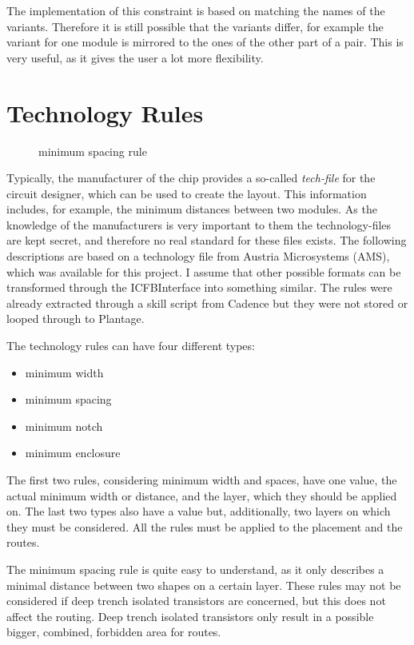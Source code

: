 The implementation of this constraint is based on matching the names of the variants. Therefore it is still possible that the variants differ, for example the variant for one module is mirrored to the ones of the other part of a pair. This is very useful, as it gives the user a lot more flexibility.

\section{Technology Rules}

\begin{figure}
	\centering
	
	\caption{minimum spacing rule}
	\label{fig:technology_rule_spacing}
\end{figure}

Typically, the manufacturer of the chip provides a so-called \textit{tech-file} for the circuit designer, which can be used to create the layout. This information includes, for example, the minimum distances between two modules. As the knowledge of the manufacturers is very important to them the technology-files are kept secret, and therefore no real standard for these files exists. The following descriptions are based on a technology file from Austria Microsystems (AMS), which was available for this project. I assume that other possible formats can be transformed through the ICFBInterface into something similar. The rules were already extracted through a skill script from Cadence but they were not stored or looped through to Plantage. 

The technology rules can have four different types:

\begin{itemize}
\item minimum width
\item minimum spacing
\item minimum notch
\item minimum enclosure
\end{itemize}

The first two rules, considering minimum width and spaces, have one value, the actual minimum width or distance, and the layer, which they should be applied on. The last two types also have a value but, additionally, two layers on which they must be considered. All the rules must be applied to the placement and the routes.

The minimum spacing rule  is quite easy to understand, as it only describes a minimal distance between two shapes on a certain layer. These rules may not be considered if deep trench isolated transistors are concerned, but this does not affect the routing. Deep trench isolated transistors only result in a possible bigger, combined, forbidden area for routes.

